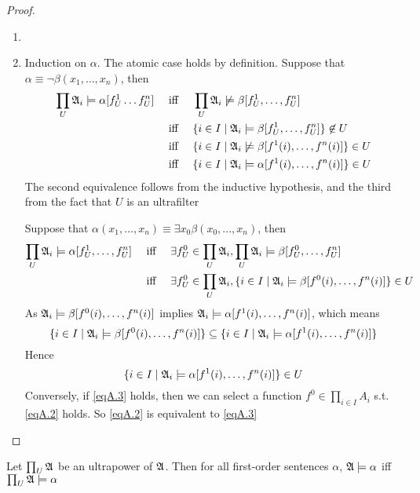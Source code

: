 \documentclass[11pt]{article}
\begin{document}
\begin{proof}
\begin{enumerate}
\item 

\item Induction on \(\alpha\). The atomic case holds by definition. Suppose that
\(\alpha\equiv\neg\beta(x_1,\dots,x_n)\), then
\begin{align*}
\prod_U\mathfrak{A}_i\models\alpha[f_U^1\dots f_U^n]&\quad\text{ iff }\quad
\prod_U\mathfrak{A}_i\not\models\beta[f_U^1,\dots,f_U^n]\\
&\quad\text{ iff }\quad
\{i\in I\mid\mathfrak{A}_i\models\beta[f_U^1,\dots,f_U^n]\}\not\in U\\
&\quad\text{ iff }\quad
\{i\in I\mid\mathfrak{A}_i\not\models\beta[f^1(i),\dots,f^n(i)]\}\in U\\
&\quad\text{ iff }\quad
\{i\in I\mid\mathfrak{A}_i\models\alpha[f^1(i),\dots,f^n(i)]\}\in U
\end{align*}
The second equivalence follows from the inductive hypothesis, and the
third from the fact that \(U\) is an ultrafilter

Suppose that \(\alpha(x_1,\dots,x_n)\equiv\exists x_0\beta(x_0,\dots,x_n)\),
then
\begin{align}
\prod_U\mathfrak{A}_i\models\alpha[f_U^1,\dots,f_U^n]&\quad\text{ iff }\quad
\exists f_U^0\in\prod_U\mathfrak{A}_i,\prod_U\mathfrak{A}_i\models\beta[f_U^0,\dots,f_U^n]\nonumber\\
&\quad\text{ iff }\quad
\exists f_U^0\in\prod_U\mathfrak{A}_i,\{i\in I\mid\mathfrak{A}_i\models\beta[f^0(i),\dots,f^n(i)]\}\in U
\label{eqA.2}
\end{align}
As \(\mathfrak{A}_i\models\beta[f^0(i),\dots,f^n(i)]\) implies
\(\mathfrak{A}_i\models\alpha[f^1(i),\dots,f^n(i)]\), which means
\begin{equation*}
\{i\in I\mid\mathfrak{A}_i\models\beta[f^0(i),\dots,f^n(i)]\}\subseteq
\{i\in I\mid\mathfrak{A}_i\models\alpha[f^1(i),\dots,f^n(i)]\}
\end{equation*}
Hence
\begin{equation}
\{i\in I\mid\mathfrak{A}_i\models\alpha[f^1(i),\dots,f^n(i)]\}\in U\label{eqA.3}
\end{equation}
Conversely, if \eqref{eqA.3} holds, then we can select a function
\(f^0\in\prod_{i\in I}A_i\) s.t. \eqref{eqA.2} holds. So \eqref{eqA.2} is
equivalent to \eqref{eqA.3}
\end{enumerate}
\end{proof}

\begin{corollary}[]
\label{corA.20}
Let \(\prod_U\mathfrak{A}\) be an ultrapower of \(\mathfrak{A}\). Then for all first-order
sentences \(\alpha\), \(\mathfrak{A}\models\alpha\) iff \(\prod_U\mathfrak{A}\models\alpha\)
\end{corollary}
\end{document}
